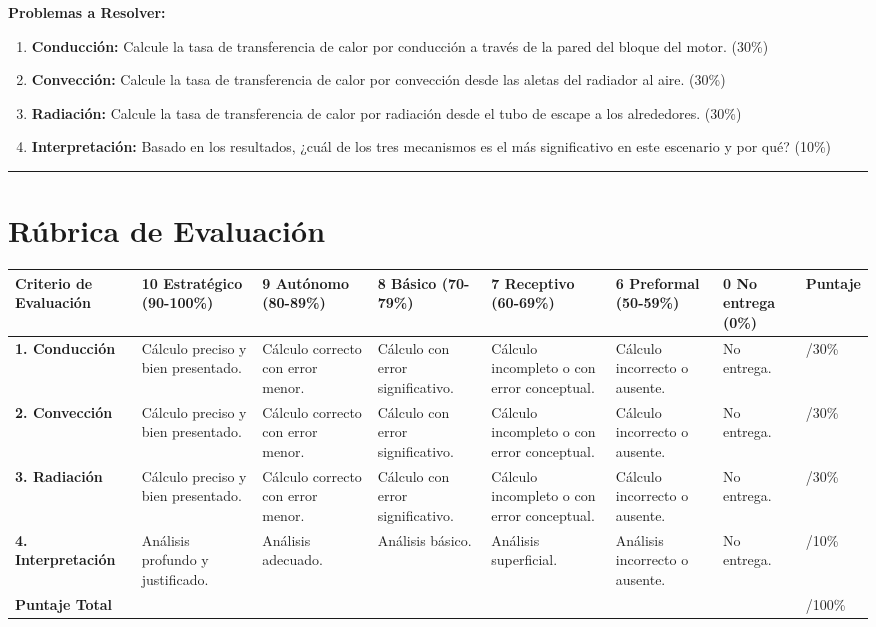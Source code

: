 \documentclass{article}
\begin{document}
\textbf{Problemas a Resolver:}

\begin{enumerate}
    \item \textbf{Conducción:} Calcule la tasa de transferencia de calor por conducción a través de la pared del bloque del motor. (30\%)
    \item \textbf{Convección:} Calcule la tasa de transferencia de calor por convección desde las aletas del radiador al aire. (30\%)
    \item \textbf{Radiación:} Calcule la tasa de transferencia de calor por radiación desde el tubo de escape a los alrededores. (30\%)
    \item \textbf{Interpretación:} Basado en los resultados, ¿cuál de los tres mecanismos es el más significativo en este escenario y por qué? (10\%)
\end{enumerate}

\vspace{5mm}
\hrule
\vspace{5mm}

\section*{Rúbrica de Evaluación}

\begin{tabularx}{\textwidth}{|X|X|X|X|X|X|X|X|}
\hline
\textbf{Criterio de Evaluación} & \textbf{10 Estratégico (90-100\%)} & \textbf{9 Autónomo (80-89\%)} & \textbf{8 Básico (70-79\%)} & \textbf{7 Receptivo (60-69\%)} & \textbf{6 Preformal (50-59\%)} & \textbf{0 No entrega (0\%)} & \textbf{Puntaje} \\
\hline
\textbf{1. Conducción} & Cálculo preciso y bien presentado. & Cálculo correcto con error menor. & Cálculo con error significativo. & Cálculo incompleto o con error conceptual. & Cálculo incorrecto o ausente. & No entrega. & /30\% \\
\hline
\textbf{2. Convección} & Cálculo preciso y bien presentado. & Cálculo correcto con error menor. & Cálculo con error significativo. & Cálculo incompleto o con error conceptual. & Cálculo incorrecto o ausente. & No entrega. & /30\% \\
\hline
\textbf{3. Radiación} & Cálculo preciso y bien presentado. & Cálculo correcto con error menor. & Cálculo con error significativo. & Cálculo incompleto o con error conceptual. & Cálculo incorrecto o ausente. & No entrega. & /30\% \\
\hline
\textbf{4. Interpretación} & Análisis profundo y justificado. & Análisis adecuado. & Análisis básico. & Análisis superficial. & Análisis incorrecto o ausente. & No entrega. & /10\% \\
\hline
\textbf{Puntaje Total} & & & & & & & /100\% \\
\hline
\end{tabularx}
\end{document}
